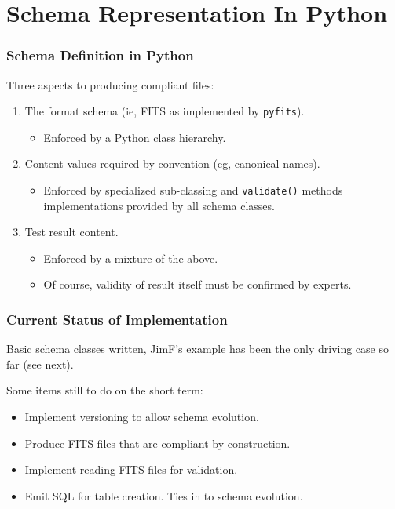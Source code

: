 \documentclass[bigger]{beamer}
\begin{document}
\section{Schema Representation In Python}

\begin{frame}
  \frametitle{Schema Definition in Python}

  Three aspects to producing compliant files:
  \begin{enumerate}
  \item The format schema (ie, FITS as implemented by \texttt{pyfits}).
    \begin{itemize}
    \item Enforced by a Python class hierarchy.
    \end{itemize}
  \item Content values required by convention (eg, canonical names).
    \begin{itemize}
    \item Enforced by specialized sub-classing and \texttt{validate()}
      methods implementations provided by all schema classes.
    \end{itemize}
  \item Test result content.
    \begin{itemize}
    \item Enforced by a mixture of the above.
    \item Of course, validity of result itself must be confirmed by
      experts.
    \end{itemize}
  \end{enumerate}
\end{frame}

\begin{frame}
  \frametitle{Current Status of Implementation}

  Basic schema classes written, JimF's example has been the only
  driving case so far (see next).

  \vspace{2mm}

  Some items still to do on the short term:

  \begin{itemize}
  \item Implement versioning to allow schema evolution.
  \item Produce FITS files that are compliant by construction.
  \item Implement reading FITS files for validation.
  \item Emit SQL for table creation.  Ties in to schema evolution.
  \end{itemize}

\end{frame}
\end{document}
